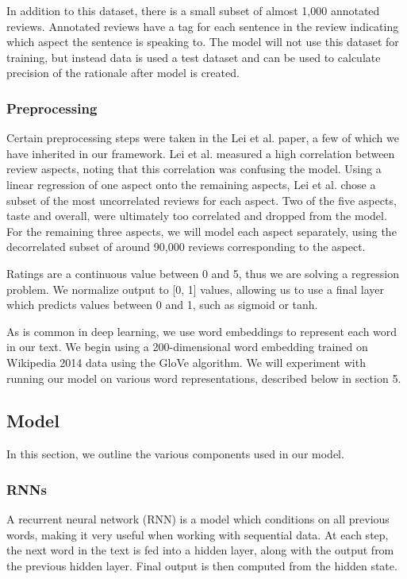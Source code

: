 \documentclass{article} %
\begin{document}
In addition to this dataset, there is a small subset of almost 1,000 annotated
reviews. Annotated reviews have a tag for each sentence in the review indicating
which aspect the sentence is speaking to. The model will not use this dataset
for training, but instead data is used a test dataset and can be used to
calculate precision of the rationale after model is created.

\subsubsection{Preprocessing}

Certain preprocessing steps were taken in the Lei et al. paper, a few of which
we have inherited in our framework. Lei et al. measured a high correlation
between review aspects, noting that this correlation was confusing the model.
Using a linear regression of one aspect onto the remaining aspects, Lei et al.
chose a subset of the most uncorrelated reviews for each aspect. Two of the five
aspects, taste and overall, were ultimately too correlated and dropped from the
model. For the remaining three aspects, we will model each aspect separately,
using the decorrelated subset of around 90,000 reviews corresponding to the
aspect.

Ratings are a continuous value between 0 and 5, thus we are solving a regression
problem. We normalize output to [0, 1] values, allowing us to use a final layer
which predicts values between 0 and 1, such as sigmoid or tanh.

As is common in deep learning, we use word embeddings to represent each word in
our text. We begin using a 200-dimensional word embedding trained on Wikipedia
2014 data using the GloVe algorithm. We will experiment with running our model
on various word representations, described below in section 5.

\subsection{Model}

In this section, we outline the various components used in our model.

\subsubsection{RNNs}

A recurrent neural network (RNN) is a model which conditions on all previous
words, making it very useful when working with sequential data. At each step,
the next word in the text is fed into a hidden layer, along with the output from
the previous hidden layer. Final output is then computed from the hidden state.
\end{document}
